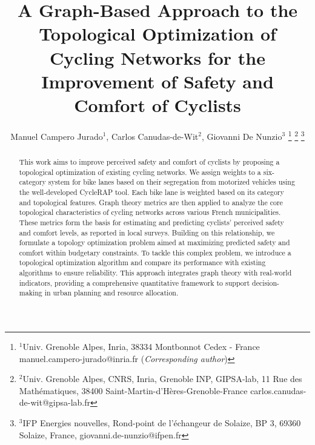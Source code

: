 \documentclass[lettersize,journal]{IEEEtran}
\begin{document}
\title{A Graph-Based Approach to the Topological Optimization of Cycling Networks for the Improvement of Safety and Comfort of Cyclists}




\author{Manuel Campero Jurado$^{1}$, Carlos Canudas-de-Wit$^{2}$,  Giovanni De Nunzio$^{3}$%
\thanks{$^{1}$Univ. Grenoble Alpes, Inria, 38334 Montbonnot Cedex - France 
        {\footnotesize manuel.campero-jurado@inria.fr} (\textit{Corresponding author})}%
\thanks{$^{2}$Univ. Grenoble Alpes, CNRS, Inria, Grenoble INP, GIPSA-lab, 11 Rue des Mathématiques, 
38400 Saint-Martin-d'Hères-Grenoble-France
        {\footnotesize carlos.canudas-de-wit@gipsa-lab.fr}}%
\thanks{$^{3}$IFP Energies nouvelles,
Rond-point de l’échangeur de Solaize, BP 3, 69360 Solaize, France,
        {\footnotesize giovanni.de-nunzio@ifpen.fr}}%
}



\maketitle

\begin{abstract}


This work aims to improve perceived safety and comfort of cyclists by proposing a topological optimization of existing cycling networks. We assign weights to a six-category system for bike lanes based on their segregation from motorized vehicles using the well-developed CycleRAP tool. Each bike lane is weighted based on its category and topological features. Graph theory metrics are then applied to analyze the core topological characteristics of cycling networks across various French municipalities. These metrics form the basis for estimating and predicting cyclists' perceived safety and comfort levels, as reported in local surveys. Building on this relationship, we formulate a topology optimization problem aimed at maximizing predicted safety and comfort within budgetary constraints. To tackle this complex problem, we introduce a topological optimization algorithm and compare its performance with existing algorithms to ensure reliability. This approach integrates graph theory with real-world indicators, providing a comprehensive quantitative framework to support decision-making in urban planning and resource allocation.


\end{abstract}
\end{document}

